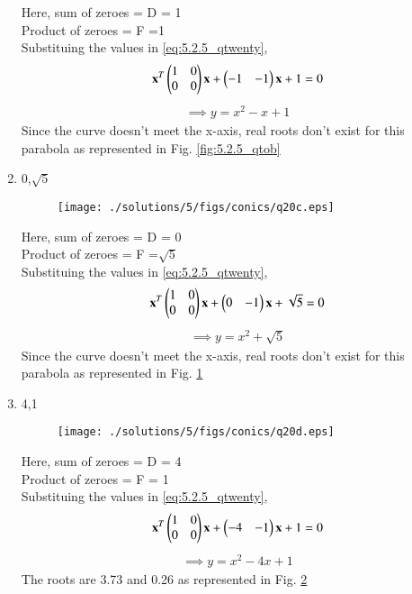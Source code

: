 \begin{enumerate}
		
Here, sum of zeroes = D = 1\\
Product of zeroes = F =1\\
Substituing the values in \ref{eq:5.2.5_qtwenty},\\
\begin{multline}
\mathbf{x}^T\begin{pmatrix}1&0\\0&0\end{pmatrix}\mathbf{x}  + \begin{pmatrix}-1&-1\end{pmatrix}\mathbf{x} +1 = 0
\end{multline}
\begin{align}
\implies y = x^2 - x + 1 
\end{align}
Since the curve doesn't meet the x-axis, real roots don't exist for this parabola as represented in Fig. \ref{fig:5.2.5_qtob}	
		\item 0,$\sqrt{5}$
			\begin{figure}[!ht]
	\centering
	\texttt{[image: ./solutions/5/figs/conics/q20c.eps]}
	\caption{}
	\label{fig:5.2.5_qtoc}	
	\end{figure}

		
Here, sum of zeroes = D = 0\\
Product of zeroes = F =$\sqrt{5}$\\
Substituing the values in \ref{eq:5.2.5_qtwenty},\\
\begin{multline}
\mathbf{x}^T\begin{pmatrix}1&0\\0&0\end{pmatrix}\mathbf{x}  + \begin{pmatrix}0&-1\end{pmatrix}\mathbf{x} + \sqrt{5} = 0
\end{multline}
\begin{align}
\implies y = x^2 + \sqrt{5}  
\end{align}
Since the curve doesn't meet the x-axis, real roots don't exist for this parabola as represented in Fig. \ref{fig:5.2.5_qtoc}	
		\item 4,1
	\begin{figure}[!ht]
	\centering
	\texttt{[image: ./solutions/5/figs/conics/q20d.eps]}
	\caption{}
	\label{fig:5.2.5_qtod}	
	\end{figure}
	
		 
Here, sum of zeroes = D = 4\\
Product of zeroes = F = 1\\
Substituing the values in \ref{eq:5.2.5_qtwenty},\\
\begin{multline}
\mathbf{x}^T\begin{pmatrix}1&0\\0&0\end{pmatrix}\mathbf{x}  + \begin{pmatrix}-4&-1\end{pmatrix}\mathbf{x} + 1 = 0
\end{multline}
\begin{align}
\implies y = x^2 - 4x + 1 
\end{align}
The roots are 3.73 and 0.26 as represented in Fig. \ref{fig:5.2.5_qtod}


\end{enumerate}

